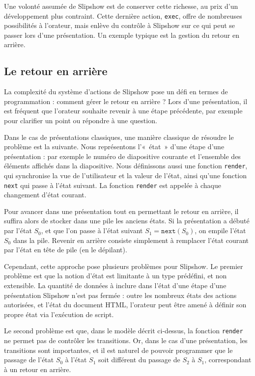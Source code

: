 \documentclass[final]{jflart}
\begin{document}
Une volonté assumée de Slipshow est de conserver cette richesse, au prix d'un développement plus contraint. Cette dernière action, \texttt{exec}, offre de nombreuses possibilités à l'orateur, mais enlève du contrôle à Slipshow sur ce qui peut se passer lors d'une présentation. Un exemple typique est la gestion du retour en arrière.

\subsection{Le retour en arrière}

La complexité du système d'actions de Slipshow pose un défi en termes de programmation : comment gérer le retour en arrière ? Lors d'une présentation, il est fréquent que l'orateur souhaite revenir à une étape précédente, par exemple pour clarifier un point ou répondre à une question.

Dans le cas de présentations classiques, une manière classique de résoudre le problème est la suivante. Nous représentons l'«~état~» d'une étape d'une présentation : par exemple le numéro de diapositive courante et l'ensemble des éléments affichés dans la diapositive. Nous définissons aussi une fonction \texttt{render}, qui synchronise la vue de l'utilisateur et la valeur de l'état, ainsi qu'une fonction \texttt{next} qui passe à l'état suivant. La fonction \texttt{render} est appelée à chaque changement d'état courant.

Pour avancer dans une présentation tout en permettant le retour en arrière, il suffira alors de stocker dans une pile les anciens états. Si la présentation a débuté par l'état $S_0$, et que l'on passe à l'état suivant $S_1=\texttt{next}(S_0)$, on empile l'état $S_0$ dans la pile. Revenir en arrière consiste simplement à remplacer l'état courant par l'état en tête de pile (en le dépilant).

Cependant, cette approche pose plusieurs problèmes pour Slipshow. Le premier problème est que la notion d'état est limitante à un type prédéfini, et non extensible. La quantité de données à inclure dans l'état d'une étape d'une présentation Slipshow n'est pas fermée : outre les nombreux états des actions autorisées, et l'état du document HTML, l'orateur peut être amené à définir son propre état via l'exécution de script.

Le second problème est que, dans le modèle décrit ci-dessus, la fonction \texttt{render} ne permet pas de contrôler les transitions. Or, dans le cas d'une présentation, les transitions sont importantes, et il est naturel de pouvoir programmer que le passage de l'état $S_0$ à l'état $S_1$ soit différent du passage de $S_2$ à $S_1$, correspondant à un retour en arrière.
\end{document}

